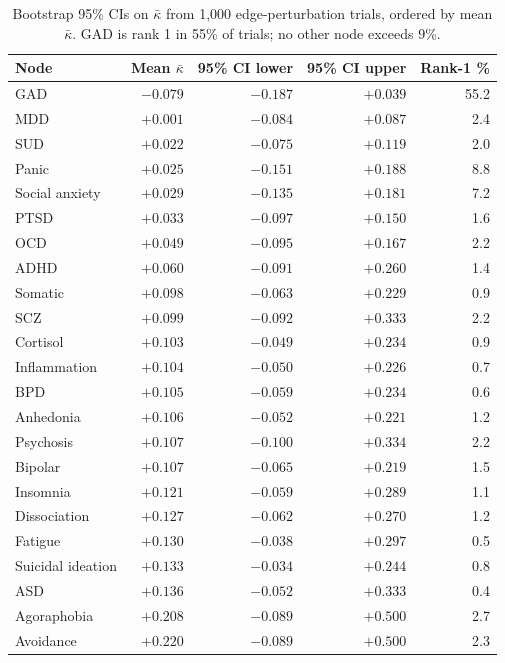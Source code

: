 \documentclass{article}
\begin{document}
\begin{table}[h]
\centering
\caption{Bootstrap 95\% CIs on $\bar\kappa$ from 1{,}000 edge-perturbation trials, ordered by mean $\bar\kappa$. GAD is rank 1 in 55\% of trials; no other node exceeds 9\%.}
\label{tab:bootstrap_full}
\footnotesize
\begin{tabular}{lrrrr}
\toprule
Node & Mean $\bar\kappa$ & 95\% CI lower & 95\% CI upper & Rank-1 \% \\
\midrule
GAD              & $-0.079$ & $-0.187$ & $+0.039$ & 55.2 \\
MDD              & $+0.001$ & $-0.084$ & $+0.087$ &  2.4 \\
SUD              & $+0.022$ & $-0.075$ & $+0.119$ &  2.0 \\
Panic            & $+0.025$ & $-0.151$ & $+0.188$ &  8.8 \\
Social anxiety   & $+0.029$ & $-0.135$ & $+0.181$ &  7.2 \\
PTSD             & $+0.033$ & $-0.097$ & $+0.150$ &  1.6 \\
OCD              & $+0.049$ & $-0.095$ & $+0.167$ &  2.2 \\
ADHD             & $+0.060$ & $-0.091$ & $+0.260$ &  1.4 \\
Somatic          & $+0.098$ & $-0.063$ & $+0.229$ &  0.9 \\
SCZ              & $+0.099$ & $-0.092$ & $+0.333$ &  2.2 \\
Cortisol         & $+0.103$ & $-0.049$ & $+0.234$ &  0.9 \\
Inflammation     & $+0.104$ & $-0.050$ & $+0.226$ &  0.7 \\
BPD              & $+0.105$ & $-0.059$ & $+0.234$ &  0.6 \\
Anhedonia        & $+0.106$ & $-0.052$ & $+0.221$ &  1.2 \\
Psychosis        & $+0.107$ & $-0.100$ & $+0.334$ &  2.2 \\
Bipolar          & $+0.107$ & $-0.065$ & $+0.219$ &  1.5 \\
Insomnia         & $+0.121$ & $-0.059$ & $+0.289$ &  1.1 \\
Dissociation     & $+0.127$ & $-0.062$ & $+0.270$ &  1.2 \\
Fatigue          & $+0.130$ & $-0.038$ & $+0.297$ &  0.5 \\
Suicidal ideation & $+0.133$ & $-0.034$ & $+0.244$ &  0.8 \\
ASD              & $+0.136$ & $-0.052$ & $+0.333$ &  0.4 \\
Agoraphobia      & $+0.208$ & $-0.089$ & $+0.500$ &  2.7 \\
Avoidance        & $+0.220$ & $-0.089$ & $+0.500$ &  2.3 \\
\bottomrule
\end{tabular}
\end{table}
\end{document}
